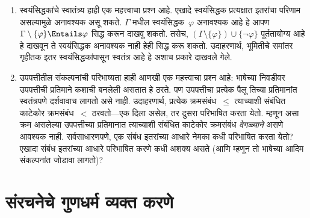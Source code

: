 \begin{explain}
\begin{enumerate}
  आपल्या उपपत्तीची प्रतिमाने असतील, तर त्यांचा तपास करण्यासाठी तसेच प्रतिमाने
  रचण्यासाठी आपण तार्किक पद्धती वापरू शकतो.
\item स्वयंसिद्धकांचे स्वातंत्र्य हाही एक महत्त्वाचा प्रश्न आहे. एखादे
  स्वयंसिद्धक प्रत्यक्षात इतरांचा परिणाम असल्यामुळे अनावश्यक असू शकते.
  $\Gamma$ मधील स्वयंसिद्धक~$\varphi$ अनावश्यक आहे हे आपण
  $\Gamma \setminus \{\varphi\} \Entails \varphi$ सिद्ध करून दाखवू शकतो. तसेच,
  $(\Gamma \setminus \{\varphi\}) \cup \{\lnot \varphi\}$ पूर्ततायोग्य आहे हे
  दाखवून ते स्वयंसिद्धक अनावश्यक नाही हेही सिद्ध करू शकतो. उदाहरणार्थ,
  भूमितीचे समांतर गृहीतक इतर स्वयंसिद्धकांपासून स्वतंत्र आहे हे अशाच प्रकारे
  दाखवले गेले.
\item उपपत्तीतील संकल्पनांची परिभाष्यता हाही आणखी एक महत्त्वाचा प्रश्न आहे:
  भाषेच्या निवडीवर उपपत्तीची प्रतिमाने कशाची बनलेली असतात हे ठरते. पण
  उपपत्तीचा प्रत्येक पैलू तिच्या प्रतिमानांत स्वतंत्रपणे दर्शवावाच लागतो असे
  नाही. उदाहरणार्थ, प्रत्येक क्रमसंबंध~$\le$ त्याच्याशी संबंधित काटेकोर
  क्रमसंबंध~$<$ ठरवतो---एक दिला असेल, तर दुसरा परिभाषित करता येतो. म्हणून
  असा क्रम असलेल्या उपपत्तीच्या प्रतिमानात त्याच्याशी संबंधित काटेकोर
  क्रमसंबंध \emph{वेगळ्याने} असणे आवश्यक नाही. सर्वसाधारणपणे, एक संबंध
  इतरांच्या आधारे नेमका कधी परिभाषित करता येतो? एखादा संबंध इतरांच्या
  आधारे परिभाषित करणे कधी अशक्य असते (आणि म्हणून तो भाषेच्या आदिम
  संकल्पनांत जोडावा लागतो)?
\end{enumerate}
\end{explain}












\section{संरचनेचे गुणधर्म व्यक्त करणे}\label{fol:mat:exs:sec}

